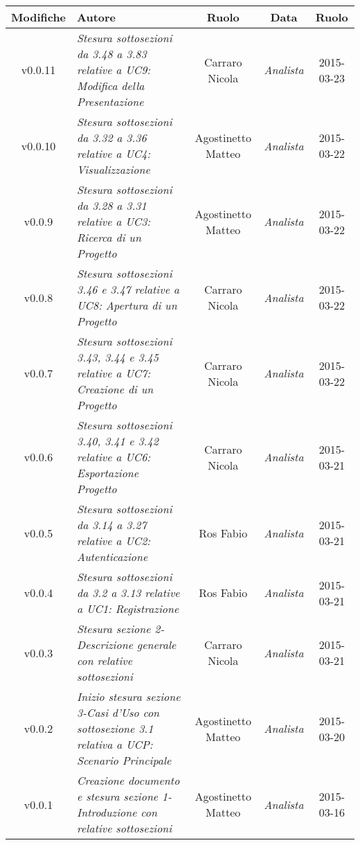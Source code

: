 \newpage
\begin{table}[h]
\centering
\begin{tabular}{|c|p{}|c|c|c|}
	\toprule
		\textbf{Modifiche} & \textbf{Autore} & \textbf{Ruolo} & \textbf{Data} & \textbf{Ruolo} \\
	\midrule
	\midrule
		v0.0.11 & \textit{Stesura sottosezioni da 3.48 a 3.83 relative a UC9: Modifica della Presentazione} & Carraro Nicola & \textit{Analista} & 2015-03-23\\
	\midrule
		v0.0.10 & \textit{Stesura sottosezioni da 3.32 a 3.36 relative a UC4: Visualizzazione} & Agostinetto Matteo & \textit{Analista} & 2015-03-22\\
	\midrule
		v0.0.9 & \textit{Stesura sottosezioni da 3.28 a 3.31 relative a UC3: Ricerca di un Progetto} & Agostinetto Matteo & \textit{Analista} & 2015-03-22\\
	\midrule
		v0.0.8 & \textit{Stesura sottosezioni 3.46 e 3.47 relative a UC8: Apertura di un Progetto} & Carraro Nicola & \textit{Analista} & 2015-03-22\\
	\midrule
		v0.0.7 & \textit{Stesura sottosezioni 3.43, 3.44 e 3.45 relative a UC7: Creazione di un Progetto} & Carraro Nicola & \textit{Analista} & 2015-03-22\\
	\midrule
		v0.0.6 & \textit{Stesura sottosezioni 3.40, 3.41 e 3.42 relative a UC6: Esportazione Progetto} & Carraro Nicola & \textit{Analista} & 2015-03-21\\
	\midrule
		v0.0.5 & \textit{Stesura sottosezioni da 3.14 a 3.27 relative a UC2: Autenticazione} & Ros Fabio & \textit{Analista} & 2015-03-21\\
	\midrule
		v0.0.4 & \textit{Stesura sottosezioni da 3.2 a 3.13 relative a UC1: Registrazione} & Ros Fabio & \textit{Analista} & 2015-03-21\\
	\midrule
		v0.0.3 & \textit{Stesura sezione 2-Descrizione generale con relative sottosezioni} & Carraro Nicola & \textit{Analista} & 2015-03-21\\
	\midrule
		v0.0.2 & \textit{Inizio stesura sezione 3-Casi d'Uso con sottosezione 3.1 relativa a UCP: Scenario Principale} & Agostinetto Matteo & \textit{Analista} & 2015-03-20\\
	\midrule
		v0.0.1 & \textit{Creazione documento e stesura sezione 1-Introduzione con relative sottosezioni} & Agostinetto Matteo & \textit{Analista} & 2015-03-16\\
	\bottomrule
\end{tabular}
\end{table}
\newpage
